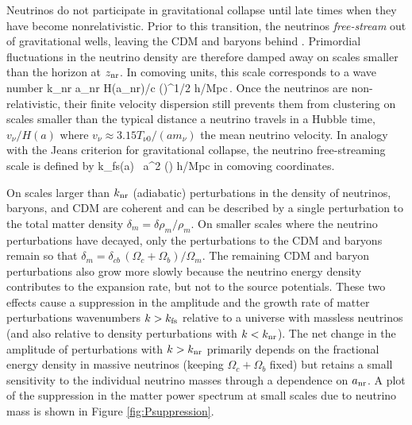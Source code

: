 Neutrinos do not participate in gravitational collapse until late times when they have become nonrelativistic. Prior to this transition, the neutrinos {\em free-stream} out of gravitational wells, leaving the CDM and baryons behind  \cite{Bond:1983hb, Ma:1996za, Hu:1997vi, Hu:1997mj}. Primordial fluctuations in the neutrino density are therefore damped away on scales smaller than the horizon at $z_{\rm nr}$. In comoving units, this scale corresponds to a wave number
\beq
k_{\rm nr} \equiv a_{\rm nr} H(a_{\rm nr})/c  \left(\right)^{1/2} h/{\rm Mpc}\,.
\eeq
Once the neutrinos are non-relativistic, their finite velocity dispersion still prevents them from clustering on scales smaller than the typical distance a neutrino travels in a Hubble time, $v_\nu /H(a)$ where $v_\nu \approx 3.15 T_{\nu 0}/(a m_\nu)$ the mean neutrino velocity. In analogy with the Jeans criterion for gravitational collapse, the neutrino free-streaming scale is defined by \cite{Bond:1983hb, Lesgourgues:2006nd}
\beq
k_{\rm fs}(a) \equiv {} \, a^2 \left(\right) h/{\rm Mpc}
\eeq
in comoving coordinates. 

On scales larger than $k_{\rm nr}$ (adiabatic) perturbations in the density of neutrinos, baryons, and CDM are coherent and can be described by a single perturbation to the total matter density $\delta_m= \delta \rho_m/\rho_m$. On smaller scales where the neutrino perturbations have decayed, only the perturbations to the CDM and baryons remain so that $\delta_{m} = \delta_{cb}\, (\Omega_{c} + \Omega_b)/\Omega_m $. The remaining CDM and baryon perturbations also grow more slowly because the neutrino energy density contributes to the expansion rate, but not to the source potentials. These two effects cause a suppression in the amplitude and the growth rate of matter perturbations wavenumbers $k > k_{\rm fs}$ relative to a universe with massless neutrinos (and also relative to density perturbations with $k<k_{\rm nr}$). The net change in the amplitude of perturbations with $k > k_{\rm nr}$ primarily depends on the fractional energy density in massive neutrinos (keeping $\Omega_c+\Omega_b$ fixed) but retains a small sensitivity to the individual neutrino masses through a dependence on $a_{\rm nr}$. A plot of the suppression in the matter power spectrum at small scales due to neutrino mass is shown in Figure \ref{fig:Psuppression}.


